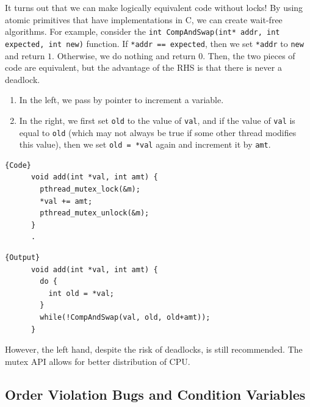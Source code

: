 \documentclass{article}
\begin{document}
    It turns out that we can make logically equivalent code without locks! By using atomic primitives that have implementations in C, we can create wait-free algorithms. For example, consider the \texttt{int CompAndSwap(int* addr, int expected, int new)} function. If \texttt{*addr == expected}, then we set \texttt{*addr} to \texttt{new} and return $1$. Otherwise, we do nothing and return $0$. Then, the two pieces of code are equivalent, but the advantage of the RHS is that there is never a deadlock. \begin{enumerate}
      \item In the left, we pass by pointer to increment a variable. 
      \item In the right, we first set \texttt{old} to the value of \texttt{val}, and if the value of \texttt{val} is equal to \texttt{old} (which may not always be true if some other thread modifies this value), then we set \texttt{old = *val} again and increment it by \texttt{amt}. 
    \end{enumerate}
    \noindent\begin{minipage}{.5\textwidth}
    \begin{lstlisting}[]{Code}
      void add(int *val, int amt) {
        pthread_mutex_lock(&m); 
        *val += amt; 
        pthread_mutex_unlock(&m); 
      }
      .
    \end{lstlisting}
    \end{minipage}
    \hfill
    \begin{minipage}{.49\textwidth}
    \begin{lstlisting}[]{Output}
      void add(int *val, int amt) {
        do {
          int old = *val;    
        }
        while(!CompAndSwap(val, old, old+amt)); 
      }
    \end{lstlisting}
    \end{minipage}
    However, the left hand, despite the risk of deadlocks, is still recommended. The mutex API allows for better distribution of CPU. 

       
  \subsection{Order Violation Bugs and Condition Variables} 
\end{document}
